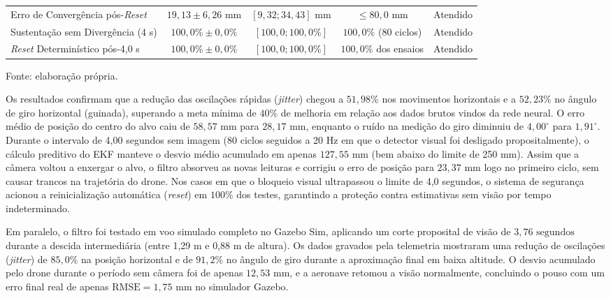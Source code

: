 \begin{table}[H]
\begin{tabular}{>{\raggedright\arraybackslash}p{3.8cm}cccc}
		Erro de Convergência pós-\textit{Reset} & $19{,}13 \pm 6{,}26\text{ mm}$ & $[9{,}32; 34{,}43]\text{ mm}$ & $\le 80{,}0\text{ mm}$ & Atendido \\
		Sustentação sem Divergência (4 s) & $100{,}0\% \pm 0{,}0\%$ & $[100{,}0; 100{,}0\%]$ & $100{,}0\%$ (80 ciclos) & Atendido \\
		\textit{Reset} Determinístico pós-4,0 s & $100{,}0\% \pm 0{,}0\%$ & $[100{,}0; 100{,}0\%]$ & $100{,}0\%$ dos ensaios & Atendido \\
		\hline
	\end{tabular}
	\vspace{0.2cm}
	\begin{flushleft}
		\footnotesize Fonte: elaboração própria.
	\end{flushleft}
\end{table}

Os resultados confirmam que a redução das oscilações rápidas (\textit{jitter}) chegou a $51{,}98\%$ nos movimentos horizontais e a $52{,}23\%$ no ângulo de giro horizontal (guinada), superando a meta mínima de $40\%$ de melhoria em relação aos dados brutos vindos da rede neural. O erro médio de posição do centro do alvo caiu de $58{,}57\text{ mm}$ para $28{,}17\text{ mm}$, enquanto o ruído na medição do giro diminuiu de $4{,}00^\circ$ para $1{,}91^\circ$. Durante o intervalo de 4,00 segundos sem imagem (80 ciclos seguidos a 20 Hz em que o detector visual foi desligado propositalmente), o cálculo preditivo do EKF manteve o desvio médio acumulado em apenas $127{,}55\text{ mm}$ (bem abaixo do limite de 250 mm). Assim que a câmera voltou a enxergar o alvo, o filtro absorveu as novas leituras e corrigiu o erro de posição para $23{,}37\text{ mm}$ logo no primeiro ciclo, sem causar trancos na trajetória do drone. Nos casos em que o bloqueio visual ultrapassou o limite de 4,0 segundos, o sistema de segurança acionou a reinicialização automática (\textit{reset}) em $100\%$ dos testes, garantindo a proteção contra estimativas sem visão por tempo indeterminado.

Em paralelo, o filtro foi testado em voo simulado completo no Gazebo Sim, aplicando um corte proposital de visão de $3{,}76\text{ segundos}$ durante a descida intermediária (entre 1,29 m e 0,88 m de altura). Os dados gravados pela telemetria mostraram uma redução de oscilações (\textit{jitter}) de $85{,}0\%$ na posição horizontal e de $91{,}2\%$ no ângulo de giro durante a aproximação final em baixa altitude. O desvio acumulado pelo drone durante o período sem câmera foi de apenas $12{,}53\text{ mm}$, e a aeronave retomou a visão normalmente, concluindo o pouso com um erro final real de apenas $\text{RMSE} = 1{,}75\text{ mm}$ no simulador Gazebo.

